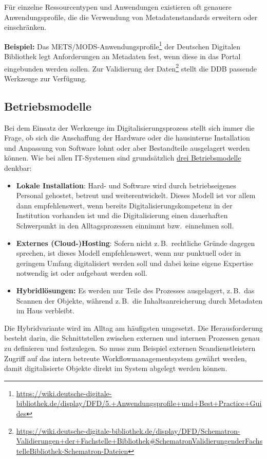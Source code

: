 \documentclass[
  11pt,
  letterpaper,
  DIV=11,
  twoside]{scrreprt}
\DeclareRobustCommand{\href}[2]{#2\footnote{\url{#1}}}
\begin{document}
Für einzelne Ressourcentypen und Anwendungen existieren oft genauere
Anwendungsprofile, die die Verwendung von Metadatenstandards erweitern
oder einschränken.

\textbf{Beispiel:} Das
METS/MODS-\href{https://wiki.deutsche-digitale-bibliothek.de/display/DFD/5.+Anwendungsprofile+und+Best+Practice+Guides}{Anwendungsprofile}
der Deutschen Digitalen Bibliothek legt Anforderungen an Metadaten fest,
wenn diese in das Portal eingebunden werden sollen. Zur
\href{https://wiki.deutsche-digitale-bibliothek.de/display/DFD/Schematron-Validierungen+der+Fachstelle+Bibliothek\#SchematronValidierungenderFachstelleBibliothek-Schematron-Dateien}{Validierung
der Daten} stellt die DDB passende Werkzeuge zur Verfügung.

\subsection{Betriebsmodelle}\label{betriebsmodelle-1}

Bei dem Einsatz der Werkzeuge im Digitalisierungsprozess stellt sich
immer die Frage, ob sich die Anschaffung der Hardware oder die
hausinterne Installation und Anpassung von Software lohnt oder aber
Bestandteile ausgelagert werden können. Wie bei allen IT-Systemen sind
grundsätzlich \hyperref[sec-betriebsmodelle]{drei Betriebsmodelle}
denkbar:

\begin{itemize}
\item
  \textbf{Lokale Installation}: Hard- und Software wird durch
  betriebseigenes Personal gehostet, betreut und weiterentwickelt.
  Dieses Modell ist vor allem dann empfehlenswert, wenn bereits
  Digitalisierungskompetenz in der Institution vorhanden ist und die
  Digitalisierung einen dauerhaften Schwerpunkt in den Alltagsprozessen
  einnimmt bzw.~einnehmen soll.
\item
  \textbf{Externes (Cloud-)Hosting}: Sofern nicht z.\,B.~rechtliche
  Gründe dagegen sprechen, ist dieses Modell empfehlenswert, wenn nur
  punktuell oder in geringem Umfang digitalisiert werden soll und dabei
  keine eigene Expertise notwendig ist oder aufgebaut werden soll.
\item
  \textbf{Hybridlösungen:} Es werden nur Teile des Prozesses
  ausgelagert, z.\,B.~das Scannen der Objekte, während z.\,B.~die
  Inhaltsanreicherung durch Metadaten im Haus verbleibt.
\end{itemize}

Die Hybridvariante wird im Alltag am häufigsten umgesetzt. Die
Herausforderung besteht darin, die Schnittstellen zwischen externen und
internen Prozessen genau zu definieren und festzulegen. So muss zum
Beispiel externen Scandienstleistern Zugriff auf das intern betreute
Workflowmanagementsystem gewährt werden, damit digitalisierte Objekte
direkt im System abgelegt werden können.
\end{document}
